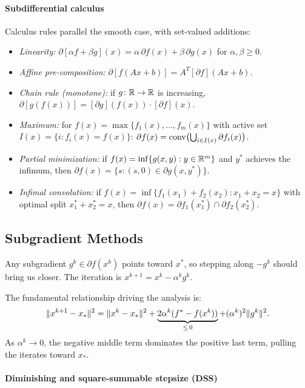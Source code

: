 \paragraph{Subdifferential calculus}

Calculus rules parallel the smooth case, with set-valued additions:
\begin{itemize}
	\item \textit{Linearity:} $\partial[\alpha f + \beta g](x) = \alpha\, \partial f(x) + \beta\, \partial g(x)$ for $\alpha, \beta \geq 0$.
	\item \textit{Affine pre-composition:} $\partial[f(Ax + b)] = A^T [\partial f](Ax + b)$.
	\item \textit{Chain rule (monotone):} if $g \colon \mathbb{R} \to \mathbb{R}$ is increasing, $\partial[g(f(x))] = [\partial g](f(x)) \cdot [\partial f](x)$.
	\item \textit{Maximum:} for $f(x) = \max\{f_1(x), \dots, f_m(x)\}$ with active set $I(x) = \{i : f_i(x) = f(x)\}$:
		$\partial f(x) = \operatorname{conv}\bigl(\bigcup_{i \in I(x)} \partial f_i(x)\bigr)$.
	\item \textit{Partial minimization:} if $f(x) = \inf\{g(x, y) : y \in \mathbb{R}^m\}$ and $y^*$ achieves the infimum, then $\partial f(x) = \{s : (s, 0) \in \partial g(x, y^*)\}$.
	\item \textit{Infimal convolution:} if $f(x) = \inf\{f_1(x_1) + f_2(x_2) : x_1 + x_2 = x\}$ with optimal split $x_1^* + x_2^* = x$, then $\partial f(x) = \partial f_1(x_1^*) \cap \partial f_2(x_2^*)$.
\end{itemize}


\subsection{Subgradient Methods}\label{sec:subgradient-methods}

Any subgradient $g^k \in \partial f(x^k)$ points toward $x^*$, so stepping along $-g^k$ should bring us closer.
The iteration is $x^{k+1} = x^k - \alpha^k g^k$.

The fundamental relationship driving the analysis is:
\begin{equation}\label{eq:subgradient-fundamental}
	\lVert x^{k+1} - x_*\rVert^2
	= \lVert x^k - x_*\rVert^2
		+ \underbrace{2\alpha^k(f^* - f(x^k))}_{\leq\, 0}
		+ (\alpha^k)^2 \lVert g^k\rVert^2.
\end{equation}
As $\alpha^k \to 0$, the negative middle term dominates the positive last term, pulling the iterates toward $x_*$.

\paragraph{Diminishing and square-summable stepsize (DSS)}

